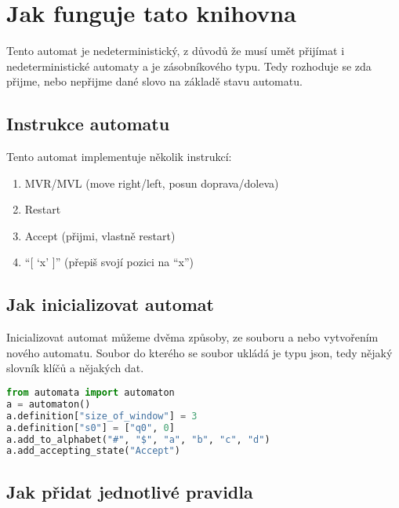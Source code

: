 \documentclass{article}
\begin{document}
\section{Jak funguje tato knihovna}

Tento automat je nedeterministický, z důvodů že musí umět přijímat i nedeterministické automaty
a je zásobníkového typu.
Tedy rozhoduje se zda přijme, nebo nepřijme dané slovo na základě stavu automatu.

\subsection{Instrukce automatu}

Tento automat implementuje několik instrukcí:
\begin{enumerate}
\item  MVR/MVL (move right/left, posun doprava/doleva)
\item  Restart
\item  Accept (přijmi, vlastně restart)
\item  “[ ‘x’ ]” (přepiš svojí pozici na “x”)
\end{enumerate}

\subsection{Jak inicializovat automat}
Inicializovat  automat můžeme dvěma způsoby, ze souboru a nebo vytvořením nového automatu.
Soubor do kterého se soubor ukládá je typu json, tedy nějaký slovník klíčů a nějakých dat.

\begin{lstlisting}[language=Python, caption=Inicializace automatu]
from automata import automaton
a = automaton()
a.definition["size_of_window"] = 3
a.definition["s0"] = ["q0", 0]
a.add_to_alphabet("#", "$", "a", "b", "c", "d")
a.add_accepting_state("Accept")
\end{lstlisting}

\subsection{Jak přidat jednotlivé pravidla}
\end{document}
